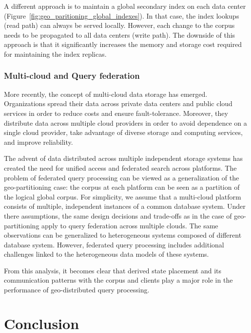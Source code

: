 A different approach is to maintain a global secondary index on each data center (Figure~\ref{fig:geo_paritioning_global_indexes}).
In that case, the index lookups (read path) can always be served locally.
However, each change to the corpus needs to be propagated to all data centers (write path).
The downside of this approach is that it significantly increases the memory and storage cost required for maintaining the
index replicas.

\subsubsection{Multi-cloud and Query federation}
More recently, the concept of multi-cloud data storage has emerged.
Organizations spread their data across private data centers and public cloud services in order to reduce costs and
ensure fault-tolerance.
Moreover, they distribute data across multiple cloud providers in order to avoid dependence on a single
cloud provider, take advantage of diverse storage and computing services, and improve reliability.

The advent of data distributed across multiple independent storage systems has created the need for unified access and
federated search across platforms.
The problem of federated query processing can be viewed as a generalization of the geo-partitioning case:
the corpus at each platform can be seen as a partition of the logical global corpus.
For simplicity, we assume that a multi-cloud platform consists of multiple, independent instances of a common database
system.
Under there assumptions, the same design decisions and trade-offs as in the case of geo-partitioning apply to query
federation across multiple clouds.
The same observations can be generalized to heterogeneous systems composed of different database system.
However, federated query processing includes additional challenges linked to the heterogeneous data models of these
systems.

From this analysis, it becomes clear that derived state placement and its communication patterns with the corpus and
clients play a major role in the performance of geo-distributed query processing.

\section{Conclusion}


